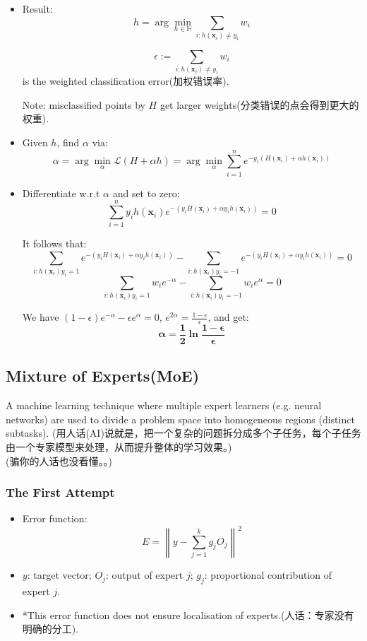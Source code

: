 \documentclass[UTF8]{ctexart}
\begin{document}
\begin{itemize}
    \item Result: 
    \[h = \arg\min_{h \in \mathbb{H}} \sum_{i: h(\mathbf{x}_i) \neq y_i} w_i\]
    
    \[\epsilon := \sum_{i: h(\mathbf{x}_i) \neq y_i} w_i\] is the weighted classification error(加权错误率).
    
    Note: misclassified points by $H$ get larger weights(分类错误的点会得到更大的权重).

    \item Given $h$, find $\alpha$ via:
    \[\alpha = \arg\min_{\alpha} \mathcal{L}(H + \alpha h) = \arg\min_{\alpha} \sum_{i=1}^{n} e^{-y_i(H(\mathbf{x}_i) + \alpha h(\mathbf{x}_i))}\]
    
    \item Differentiate w.r.t $\alpha$ and set to zero:
    \[\sum_{i=1}^{n} y_i h(\mathbf{x}_i) e^{-(y_i H(\mathbf{x}_i) + \alpha y_i h(\mathbf{x}_i))} = 0\]
    
    It follows that:
    \[\sum_{i: h(\mathbf{x}_i) y_i = 1} e^{-(y_i H(\mathbf{x}_i) + \alpha y_i h(\mathbf{x}_i))} - \sum_{i: h(\mathbf{x}_i) y_i = -1} e^{-(y_i H(\mathbf{x}_i) + \alpha y_i h(\mathbf{x}_i))} = 0\]
    \[\sum_{i: h(\mathbf{x}_i) y_i = 1} w_i e^{-\alpha} - \sum_{i: h(\mathbf{x}_i) y_i = -1} w_i e^{\alpha} = 0\]
    
    We have $(1 - \epsilon) e^{-\alpha} - \epsilon e^{\alpha} = 0$, $e^{2\alpha} = \frac{1-\epsilon}{\epsilon}$, and get:
    \[\boxed{\bm{\alpha = \frac{1}{2} \ln \frac{1 - \epsilon}{\epsilon}}}\]
    
\end{itemize}

\subsection{Mixture of Experts(MoE)}
A machine learning technique where multiple expert learners 
(e.g. neural networks) are used to divide a problem space into
homogeneous regions (distinct subtasks).
(用人话(AI)说就是，把一个复杂的问题拆分成多个子任务，每个子任务由一个专家模型来处理，从而提升整体的学习效果。)\\
(骗你的人话也没看懂。。)

    \subsubsection{The First Attempt}
\begin{itemize}
    \item Error function:
    \[E = \left\| y - \sum_{j=1}^{k} g_j O_j \right\|^2\]
    
    \item $y$: target vector; $O_j$: output of expert $j$; $g_j$: proportional contribution of expert $j$.
    
    \item *This error function does not ensure localisation of experts.(人话：专家没有明确的分工).
\end{itemize}
\end{document}
